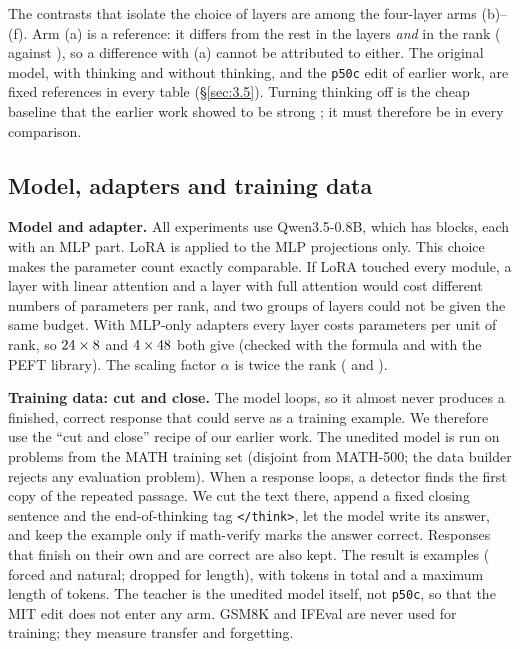 \documentclass[11pt]{article}
\newcommand{\fitwidth}[1]{\resizebox{\ifdim\width>\linewidth\linewidth\else\width\fi}{!}{#1}}
\begin{document}
\begin{table}[htbp]
\centering
\caption{The six arms. Layers are numbered 0 to \NModelLayers{}$-$1. In arms (b), (c) and (f) the layers can change with the seed; in (d) and (e) they are the same in every seed. Source: \texttt{resultados/p3\_lista\_lora.csv}.}\label{tab:arms}
\footnotesize
\fitwidth{}
\end{table}

The contrasts that isolate the choice of layers are among the four-layer arms (b)--(f). Arm (a) is a reference: it differs from the rest in the layers \emph{and} in the rank (\RankFull{} against \RankFour{}), so a difference with (a) cannot be attributed to either. The original model, with thinking and without thinking, and the \texttt{p50c} edit of earlier work, are fixed references in every table (\S\ref{sec:3.5}). Turning thinking off is the cheap baseline that the earlier work showed to be strong \citep{giraldo2026}; it must therefore be in every comparison.

\subsection{Model, adapters and training data}\label{sec:3.2}

\textbf{Model and adapter.} All experiments use Qwen3.5-0.8B, which has \NModelLayers{} blocks, each with an MLP part. LoRA is applied to the MLP projections only. This choice makes the parameter count exactly comparable. If LoRA touched every module, a layer with linear attention and a layer with full attention would cost different numbers of parameters per rank, and two groups of layers could not be given the same budget. With MLP-only adapters every layer costs \ParamsPerRankLayer{} parameters per unit of rank, so $24 \times 8$ and $4 \times 48$ both give \ParamsLora{} (checked with the formula and with the PEFT library). The scaling factor $\alpha$ is twice the rank (\AlphaFull{} and \AlphaFour{}).

\textbf{Training data: cut and close.} The model loops, so it almost never produces a finished, correct response that could serve as a training example. We therefore use the ``cut and close'' recipe of our earlier work. The unedited model is run on \NTrainProblems{} problems from the MATH training set (disjoint from MATH-500; the data builder rejects any evaluation problem). When a response loops, a detector finds the first copy of the repeated passage. We cut the text there, append a fixed closing sentence and the end-of-thinking tag \texttt{</think>}, let the model write its answer, and keep the example only if math-verify marks the answer correct. Responses that finish on their own and are correct are also kept. The result is \NExamples{} examples (\NForced{} forced and \NNatural{} natural; \NDroppedLong{} dropped for length), with \NTrainTokens{} tokens in total and a maximum length of \MaxTrainTokens{} tokens. The teacher is the unedited model itself, not \texttt{p50c}, so that the MIT edit does not enter any arm. GSM8K and IFEval are never used for training; they measure transfer and forgetting.
\end{document}
